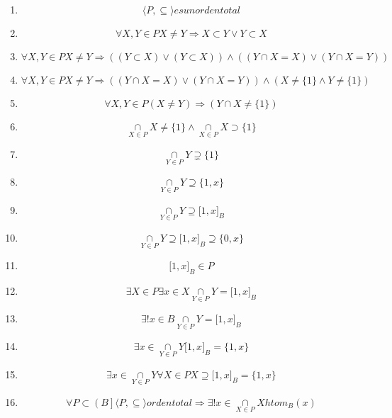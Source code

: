 \begin{enumerate}
\begin{enumerate}
\begin{enumerate}
      \begin{enumerate}
      \def\labelenumiv{\arabic{enumiv}.}
      \tightlist
      \item
        \[{\langle{P, \subseteq}\rangle}\mathit{es}\mathit{un}\mathit{orden}\mathit{total}\]
      \item
        \[\forall X,{Y \in P}{X \neq Y}\Rightarrow{{X \subset {Y \vee Y}} \subset X}\]
      \item
        \[\forall X,{Y \in P}{X \neq Y}\Rightarrow{\left( {\left( {Y \subset X} \right) \vee \left( {Y \subset X} \right)} \right) \land \left( {\left( {{Y \cap X} = X} \right) \vee \left( {{Y \cap X} = Y} \right)} \right)}\]
      \item
        \[\forall X,{Y \in P}{X \neq Y}\Rightarrow{\left( {\left( {{Y \cap X} = X} \right) \vee \left( {{Y \cap X} = Y} \right)} \right) \land \left( {{X \neq {{\{ 1\}} \land Y}} \neq {\{ 1\}}} \right)}\]
      \item
        \[\forall X,{Y \in P}\left( {X \neq Y} \right)\Rightarrow\left( {{Y \cap X} \neq {\{ 1\}}} \right)\]
      \item
        \[\underset{X \in P}{\cap}{X \neq {{\{ 1\}} \land \underset{X \in P}{\cap}}}{X \supset {\{ 1\}}}\]
      \item
        \[\underset{Y \in P}{\cap}Y \supsetneq {\{ 1\}}\]
      \item
        \[\underset{Y \in P}{\cap}{Y \supseteq {\{{1,x}\}}}\]
      \item
        \[\underset{Y \in P}{\cap}{Y \supseteq {\lbrack{1,x}\rbrack}_{B}}\]
      \item
        \[\underset{Y \in P}{\cap}{{Y \supseteq {\lbrack{1,x}\rbrack}_{B}} \supseteq {\{{0,x}\}}}\]
      \item
        \[{\lbrack{1,x}\rbrack}_{B} \in P\]
      \item
        \[\exists{X \in P}\exists{x \in X}{\underset{Y \in P}{\cap}{Y = {\lbrack{1,x}\rbrack}_{B}}}\]
      \item
        \[\exists!{x \in B}{\underset{Y \in P}{\cap}{Y = {\lbrack{1,x}\rbrack}_{B}}}\]
      \item
        \[\exists{x \in {\underset{Y \in P}{\cap}Y{{\lbrack{1,x}\rbrack}_{B} = {\{{1,x}\}}}}}\]
      \item
        \[\exists{x \in {\underset{Y \in P}{\cap}Y\forall{X \in P}{{X \supseteq {\lbrack{1,x}\rbrack}_{B}} = {\{{1,x}\}}}}}\]
      \item
        \[\forall{P \subset \left( B \right\rbrack}{\langle{P, \subseteq}\rangle}\mathit{orden}\mathit{total}\Rightarrow\exists!{x \in \underset{X \in P}{\cap}}X\mathsf{\mathit{htom}}_{B}{(x)}\]

\end{enumerate}
\end{enumerate}
\end{enumerate}
\end{enumerate}
